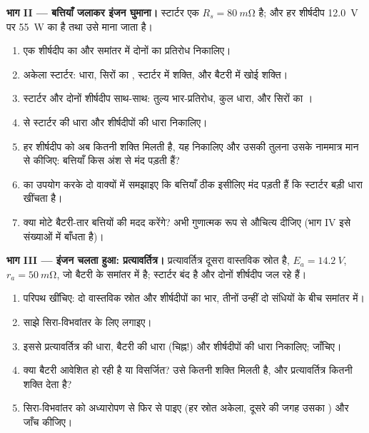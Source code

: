 \begin{problem}
\medskip
\noindent\textbf{भाग II --- बत्तियाँ जलाकर इंजन घुमाना।}
स्टार्टर एक  $R_s = \qty{80}{m\ohm}$ है; और हर शीर्षदीप
\qty{12.0}{V} पर \qty{55}{W} का है तथा उसे  माना जाता है।
\begin{enumerate}[resume]
  \item एक शीर्षदीप का और समांतर में दोनों का प्रतिरोध निकालिए।
  \item अकेला स्टार्टर: धारा, सिरों का , स्टार्टर में शक्ति, और
        बैटरी में खोई शक्ति।
  \item स्टार्टर और दोनों शीर्षदीप साथ-साथ: तुल्य भार-प्रतिरोध, कुल धारा,
        और सिरों का ।
  \item {} से स्टार्टर की धारा और शीर्षदीपों की धारा निकालिए।
  \item हर शीर्षदीप को अब कितनी शक्ति मिलती है, यह निकालिए और उसकी तुलना
        उसके नाममात्र मान से कीजिए: बत्तियाँ किस अंश से मंद पड़ती हैं?
  \item {} का उपयोग करके दो वाक्यों में समझाइए कि बत्तियाँ ठीक इसीलिए
        मंद पड़ती हैं कि स्टार्टर बड़ी धारा खींचता है।
  \item क्या मोटे बैटरी-तार बत्तियों की मदद करेंगे? अभी गुणात्मक रूप से
        औचित्य दीजिए (भाग IV इसे संख्याओं में बाँधता है)।
\end{enumerate}

\medskip
\noindent\textbf{भाग III --- इंजन चलता हुआ: प्रत्यावर्तित्र।}
प्रत्यावर्तित्र दूसरा वास्तविक स्रोत है, $E_a = \qty{14.2}{V}$,
$r_a = \qty{50}{m\ohm}$, जो बैटरी के समांतर में है; स्टार्टर
बंद है और दोनों शीर्षदीप जल रहे हैं।
\begin{enumerate}[resume]
  \item परिपथ खींचिए: दो वास्तविक स्रोत और शीर्षदीपों का भार, तीनों उन्हीं
        दो संधियों के बीच समांतर में।
  \item साझे सिरा-विभवांतर के लिए  लगाइए।
  \item इससे प्रत्यावर्तित्र की धारा, बैटरी की धारा (चिह्न!) और
        शीर्षदीपों की धारा निकालिए;  जाँचिए।
  \item क्या बैटरी आवेशित हो रही है या विसर्जित? उसे कितनी शक्ति मिलती है,
        और प्रत्यावर्तित्र कितनी शक्ति देता है?
  \item सिरा-विभवांतर को अध्यारोपण से फिर से पाइए (हर स्रोत अकेला, दूसरे की
        जगह उसका ) और जाँच कीजिए।
\end{enumerate}


\end{problem}

